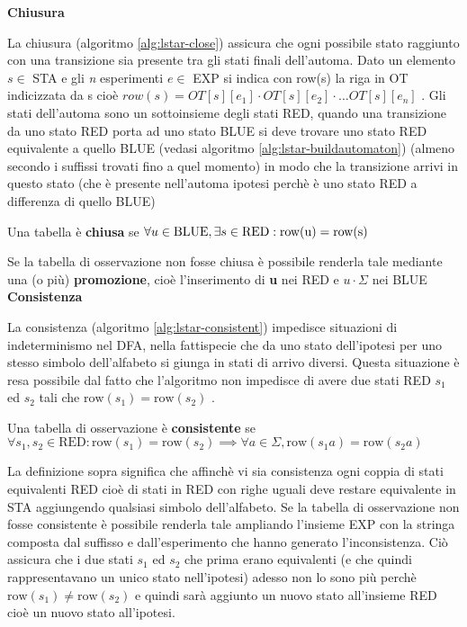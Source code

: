 {\large\textbf{Chiusura}}

La chiusura (algoritmo \ref{alg:lstar-close}) assicura che ogni possibile stato raggiunto con una transizione sia presente tra gli stati finali dell'automa. Dato un elemento $s \in$ STA e gli \textit{n} esperimenti $e \in $ EXP si indica con row(s) la riga in OT indicizzata da s cioè $row(s)=OT[s][e_1] \cdot OT[s][e_2] \cdot \dots OT[s][e_n]$ . Gli stati dell'automa sono un sottoinsieme degli stati RED, quando una transizione da uno stato RED porta ad uno stato BLUE  si deve trovare uno stato RED equivalente a quello BLUE (vedasi algoritmo \ref{alg:lstar-buildautomaton}) (almeno secondo i suffissi trovati fino a quel momento) in modo che la transizione arrivi in questo stato (che è presente nell'automa ipotesi perchè è uno stato RED a differenza di quello BLUE)
\begin{definizione*} Una tabella è \textbf{chiusa} se $\forall u \in \text{BLUE}, \exists s\\ \in \text{RED} : \text{row(u)} = \text{row(s)}$
\end{definizione*}
Se la tabella di osservazione non fosse chiusa è possibile renderla tale mediante una (o più) \textbf{promozione}, cioè l'inserimento di \textbf{u} nei RED e $u \cdot \Sigma$ nei BLUE\\

{\large\textbf{Consistenza}}

La consistenza  (algoritmo \ref{alg:lstar-consistent}) impedisce situazioni di indeterminismo nel DFA, nella fattispecie che da uno stato dell'ipotesi per uno stesso simbolo dell'alfabeto si giunga in stati di arrivo diversi. Questa situazione è resa possibile dal fatto che l'algoritmo non impedisce di avere due stati RED $s_1$ ed $s_2$ tali che $\text{row}(s_1) = \text{row}(s_2)$ . 
\begin{definizione*}Una tabella di osservazione è \textbf{consistente} se $\forall s_1,s_2 \in \text{RED} : \text{row}(s_1)=\text{row}(s_2)\implies\forall a \in \Sigma,\text{row}(s_1a)=\text{row}(s_2a)$
\end{definizione*} 

La definizione sopra significa che affinchè vi sia consistenza ogni coppia di stati equivalenti RED cioè di stati in RED con righe uguali deve restare equivalente in STA aggiungendo qualsiasi simbolo dell'alfabeto. 
Se la tabella di osservazione non fosse consistente è possibile renderla tale ampliando l'insieme EXP con la stringa composta dal suffisso e dall'esperimento che hanno generato l'inconsistenza. Ciò assicura che i due stati $s_1$ ed $s_2$ che prima erano equivalenti (e che quindi rappresentavano un unico stato nell'ipotesi) adesso non lo sono più perchè  $\text{row}(s_1) \neq \text{row}(s_2)$ e quindi sarà aggiunto un nuovo stato all'insieme RED cioè un nuovo stato all'ipotesi.

